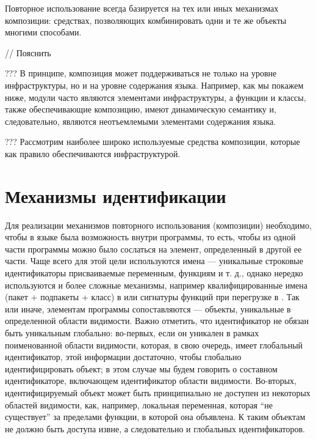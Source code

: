 Повторное использование всегда базируется на тех или иных механизмах композиции: средствах, позволяющих комбинировать одни и те же объекты многими способами.

// Пояснить

??? В принципе, композиция может поддерживаться не только на уровне инфраструктуры, но и на уровне содержания языка. Например, как мы покажем ниже, модули часто являются элементами инфраструктуры, а функции и классы, также обеспечивающие композицию, имеют динамическую семантику и, следовательно, являются неотъемлемыми элементами содержания языка.

??? Рассмотрим наиболее широко используемые средства композиции, которые как правило обеспечиваются инфраструктурой.

\section{Механизмы идентификации}

Для реализации механизмов повторного использования (композиции) необходимо, чтобы в языке была возможность  внутри программы, то есть, чтобы из одной части программы можно было сослаться на элемент, определенный в другой ее части. Чаще всего для этой цели используются имена --- уникальные строковые идентификаторы присваиваемые переменным, функциям и т. д., однако нередко используются и более сложные механизмы, например квалифицированные имена (пакет + подпакеты + класс) в  \cite{JLS} или сигнатуры функций при перегрузке в  \cite{???}. Так или иначе, элементам программы сопоставляются  --- объекты, уникальные в определенной области видимости. Важно отметить, что идентификатор не обязан быть уникальным глобально: во-первых, если он уникален в рамках поименованной области видимости, которая, в свою очередь, имеет глобальный идентификатор, этой информации достаточно, чтобы глобально идентифицировать объект; в этом случае мы будем говорить о составном идентификаторе, включающем идентификатор области видимости. Во-вторых, идентифицируемый объект может быть принципиально не доступен из некоторых областей видимости, как, например, локальная переменная, которая ``не существует'' за пределами функции, в которой она объявлена. К таким объектам не должно быть доступа извне, а следовательно и глобальных идентификаторов.


